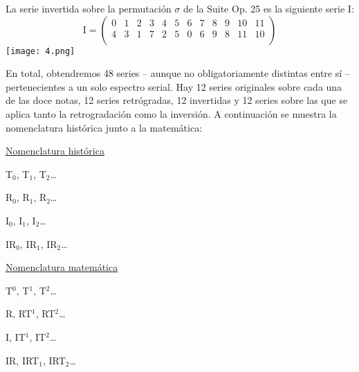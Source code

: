 		La serie invertida sobre la permutación $\sigma$ de la Suite Op. 25 es la siguiente serie I:
		$$
		\text{I}=\left(\begin{matrix}0&1&2&3&4&5&6&7&8&9&10&11\\4&3&1&7&2&5&0&6&9&8&11&10\\\end{matrix}\right)
		$$		
		\texttt{[image: 4.png]}
				
		En total, obtendremos 48 series -- aunque no obligatoriamente distintas entre sí -- pertenecientes a un solo espectro serial. Hay 12 series originales sobre cada una de las doce notas, 12 series retrógradas, 12 invertidas y 12 series sobre las que se aplica tanto la retrogradación como la inversión. A continuación se muestra la nomenclatura histórica junto a la matemática:
		
		\begin{center}
		\begin{multicols}{2}
			\underline{Nomenclatura histórica}
			
			T$_0$, T$_1$, T$_2$\ldots
			
			R$_0$, R$_1$, R$_2$\ldots
			
			I$_0$, I$_1$, I$_2$\ldots
			
			IR$_0$, IR$_1$, IR$_2$\ldots
			
			\underline{Nomenclatura matemática}
			
			T$^0$, T$^1$, T$^2$\ldots
			
			R, RT$^1$, RT$^2$\ldots
			
			I, IT$^1$, IT$^2$\ldots
			
			IR, IRT$_1$, IRT$_2$\ldots
		\end{multicols}
		\end{center}

